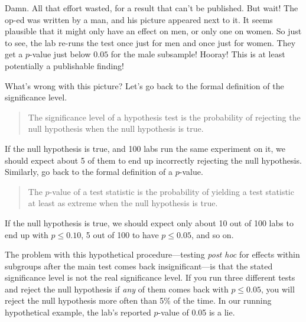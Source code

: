 \documentclass[
  12pt,
  oneside,openany]{book}
\begin{document}
Damn. All that effort wasted, for a result that can't be published. But wait! The op-ed was written by a man, and his picture appeared next to it. It seems plausible that it might only have an effect on men, or only one on women. So just to see, the lab re-runs the test once just for men and once just for women. They get a \(p\)-value just below \(0.05\) for the male subsample! Hooray! This is at least potentially a publishable finding!

What's wrong with this picture? Let's go back to the formal definition of the significance level.

\begin{quote}
The significance level of a hypothesis test is the probability of rejecting the null hypothesis when the null hypothesis is true.
\end{quote}

If the null hypothesis is true, and 100 labs run the same experiment on it, we should expect about 5 of them to end up incorrectly rejecting the null hypothesis. Similarly, go back to the formal definition of a \(p\)-value.

\begin{quote}
The \(p\)-value of a test statistic is the probability of yielding a test statistic at least as extreme when the null hypothesis is true.
\end{quote}

If the null hypothesis is true, we should expect only about 10 out of 100 labs to end up with \(p \leq 0.10\), 5 out of 100 to have \(p \leq 0.05\), and so on.

The problem with this hypothetical procedure---testing \emph{post hoc} for effects within subgroups after the main test comes back insignificant---is that the stated significance level is not the real significance level. If you run three different tests and reject the null hypothesis if \emph{any} of them comes back with \(p \leq 0.05\), you will reject the null hypothesis more often than 5\% of the time. In our running hypothetical example, the lab's reported \(p\)-value of 0.05 is a lie.
\end{document}
